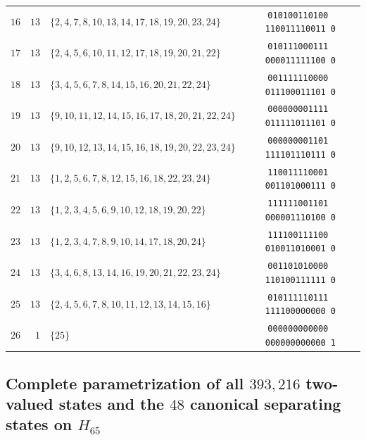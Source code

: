 \documentclass[
  aps,
  pra,
  reprint,
  superscriptaddress,
  amsmath,
  amssymb,
  nofootinbib,
  floatfix
]{revtex4-2}
\theoremstyle{definition}
\theoremstyle{remark}
\begin{document}
\begin{table}[t]
\begin{ruledtabular}
\begin{tabular}{rrlc}
$16$ & $13$ & $\{2,4,7,8,10,13,14,17,18,19,20,23,24\}$ & \texttt{010100110100\,110011110011\,0} \\
$17$ & $13$ & $\{2,4,5,6,10,11,12,17,18,19,20,21,22\}$ & \texttt{010111000111\,000011111100\,0} \\
$18$ & $13$ & $\{3,4,5,6,7,8,14,15,16,20,21,22,24\}$ & \texttt{001111110000\,011100011101\,0} \\
$19$ & $13$ & $\{9,10,11,12,14,15,16,17,18,20,21,22,24\}$ & \texttt{000000001111\,011111011101\,0} \\
$20$ & $13$ & $\{9,10,12,13,14,15,16,18,19,20,22,23,24\}$ & \texttt{000000001101\,111101110111\,0} \\
$21$ & $13$ & $\{1,2,5,6,7,8,12,15,16,18,22,23,24\}$ & \texttt{110011110001\,001101000111\,0} \\
$22$ & $13$ & $\{1,2,3,4,5,6,9,10,12,18,19,20,22\}$ & \texttt{111111001101\,000001110100\,0} \\
$23$ & $13$ & $\{1,2,3,4,7,8,9,10,14,17,18,20,24\}$ & \texttt{111100111100\,010011010001\,0} \\
$24$ & $13$ & $\{3,4,6,8,13,14,16,19,20,21,22,23,24\}$ & \texttt{001101010000\,110100111111\,0} \\
$25$ & $13$ & $\{2,4,5,6,7,8,10,11,12,13,14,15,16\}$ & \texttt{010111110111\,111100000000\,0} \\ \hline
$26$ & $1$ & $\{25\}$ & \texttt{000000000000\,000000000000\,1}
\end{tabular}
\end{ruledtabular}
\end{table}

\subsection{Complete parametrization of all \texorpdfstring{$393{,}216$}{393,216} two-valued states and the \texorpdfstring{$48$}{48} canonical separating states on \texorpdfstring{$H_{65}$}{H\_65}}\label{app:states-h65}
\end{document}
